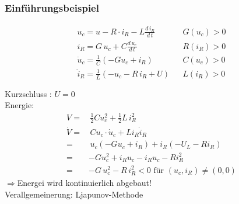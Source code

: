 \documentclass[11pt,a4paper]{article}
\begin{document}
\subsubsection{Einführungsbeispiel}
\begin{figure}[H] 
  \centering 
  \def\svgwidth{250pt} 
   
\end{figure} 
\begin{equation*}
\begin{matrix}
u_c = u - R\cdot i_R - L \frac{d\,i_R}{d\,t}&& G(u_c)> 0\\
i_R = G\,u_c + C \frac{d\,u_c}{d\,t} && R(i_R) > 0\\
\dot u_c = \frac{1}{C}(-G u_c + i_R) && C(u_c) >0\\
\dot i_R = \frac{1}{L} (-u_c - R\, i_R + U) && L(i_R)> 0 \\
&& \\
\end{matrix}
\end{equation*}
Kurzschluss : $U=0$\\
Energie: 
\begin{align*}
V = &\,\frac{1}{2} C u_c^2 + \frac{1}{2} L \, i_R^2\\
\dot V =& \,C u_c \cdot \dot u_c + L i_R \dot i_R \\
=&\, u_c (-G u_c + i_R) + i_R (-U_L -R i_R)\\
=& -G u_c^2 + i_R u_c - i_R u_c - R i_R^2\\
=& -G \,u_c^2 - R\,i_R^2 < 0 \text{  für } (u_c, i_R) \ne (0,0)
\end{align*}
$\Rightarrow $Energei wird kontinuierlich abgebaut!\\
Verallgemeinerung: Ljapunov-Methode
\end{document}
